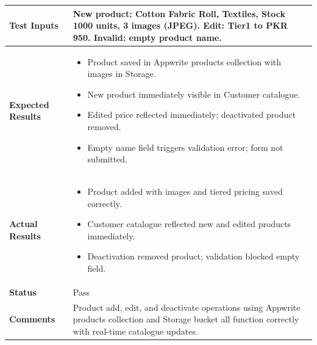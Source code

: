 \begin{table}[H]
\begin{tabular}{|p{3.2cm}|p{10.8cm}|}
\textbf{Test Inputs} & New product: Cotton Fabric Roll, Textiles, Stock 1000 units, 3 images (JPEG). Edit: Tier1 to PKR 950. Invalid: empty product name. \\ \hline
\textbf{Expected Results} &
\begin{itemize}[leftmargin=*,noitemsep]
\item Product saved in Appwrite products collection with images in Storage.
\item New product immediately visible in Customer catalogue.
\item Edited price reflected immediately; deactivated product removed.
\item Empty name field triggers validation error; form not submitted.
\end{itemize} \\ \hline
\textbf{Actual Results} &
\begin{itemize}[leftmargin=*,noitemsep]
\item Product added with images and tiered pricing saved correctly.
\item Customer catalogue reflected new and edited products immediately.
\item Deactivation removed product; validation blocked empty field.
\end{itemize} \\ \hline
\textbf{Status} & Pass \\ \hline
\textbf{Comments} & Product add, edit, and deactivate operations using Appwrite products collection and Storage bucket all function correctly with real-time catalogue updates. \\ \hline
\end{tabular}
\end{table}
\newpage
